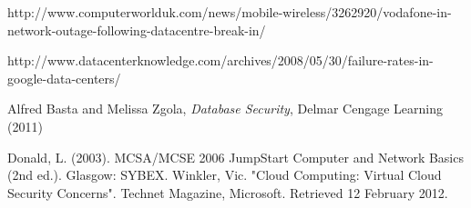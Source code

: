 \documentclass[11pt]{article}
\begin{document}
\begin{thebibliography}{}
  http://www.computerworlduk.com/news/mobile-wireless/3262920/vodafone-in-network-outage-following-datacentre-break-in/

  http://www.datacenterknowledge.com/archives/2008/05/30/failure-rates-in-google-data-centers/

  

  Alfred Basta and Melissa Zgola, {\it Database Security}, Delmar Cengage Learning (2011)

 Donald, L. (2003). MCSA/MCSE 2006 JumpStart Computer and Network Basics (2nd ed.). Glasgow: SYBEX.
 Winkler, Vic. "Cloud Computing: Virtual Cloud Security Concerns". Technet Magazine, Microsoft. Retrieved 12 February 2012.

\end{thebibliography}
\end{document}
